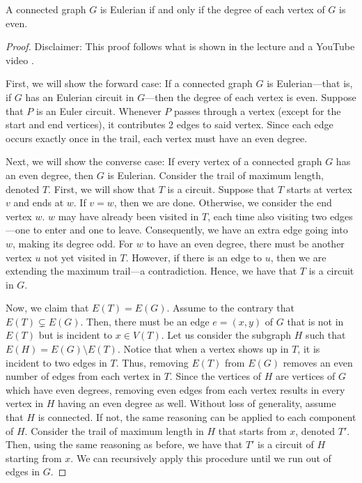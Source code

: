 \begin{theorem}[Euler, 1736]\label{thm:euler-graph-criterion}
  A connected graph \(G\) is Eulerian if and only if the degree of each vertex 
  of \(G\) is even.
\end{theorem}

\begin{proof}
  Disclaimer: This proof follows what is shown in the lecture and a YouTube video \cite{euler-graph-prf}.

  First, we will show the forward case: If a connected graph \(G\) is Eulerian---that is, if \(G\) has an Eulerian circuit in \(G\)---then the degree of each vertex is even. Suppose that \(P\) is an Euler circuit. Whenever \(P\) passes through a vertex (except for the start and end vertices), it contributes 2 edges to said vertex. Since each edge occurs exactly once in the trail, each vertex must have an even degree.

  Next, we will show the converse case: If every vertex of a connected graph \(G\) has an even degree, then \(G\) is Eulerian. Consider the trail of maximum length, denoted \(T\). First, we will show that \(T\) is a circuit. Suppose that \(T\) starts at vertex \(v\) and ends at \(w\). If \(v = w\), then we are done. Otherwise, we consider the end vertex \(w\). \(w\) may have already been visited in \(T\), each time also visiting two edges---one to enter and one to leave. Consequently, we have an extra edge going into \(w\), making its degree odd. For \(w\) to have an even degree, there must be another vertex \(u\) not yet visited in \(T\). However, if there is an edge to \(u\), then we are extending the maximum trail---a contradiction. Hence, we have that \(T\) is a circuit in \(G\). 

  Now, we claim that \(E(T) = E(G)\). Assume to the contrary that \(E(T) \subsetneq E(G)\). Then, there must be an edge \(e = (x, y)\) of \(G\) that is not in \(E(T)\) but is incident to \(x \in V(T)\). Let us consider the subgraph \(H\) such that \(E(H) = E(G) \setminus E(T)\). Notice that when a vertex shows up in \(T\), it is incident to two edges in \(T\). Thus, removing \(E(T)\) from \(E(G)\) removes an even number of edges from each vertex in \(T\). Since the vertices of \(H\) are vertices of \(G\) which have even degrees, removing even edges from each vertex results in every vertex in \(H\) having an even degree as well. Without loss of generality, assume that \(H\) is connected. If not, the same reasoning can be applied to each component of \(H\). Consider the trail of maximum length in \(H\) that starts from \(x\), denoted \(T'\). Then, using the same reasoning as before, we have that \(T'\) is a circuit of \(H\) starting from \(x\). We can recursively apply this procedure until we run out of edges in \(G\). 


\end{proof}
